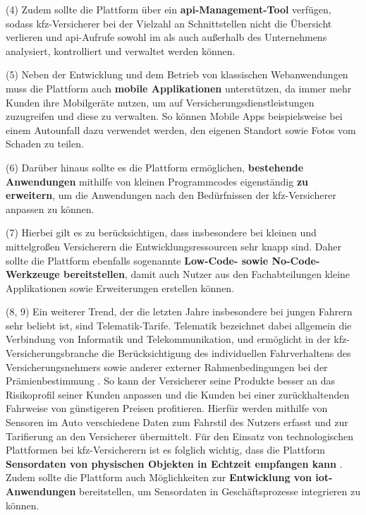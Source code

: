 (4) Zudem sollte die Plattform über ein \textbf{\ac{api}-Management-Tool} verfügen, sodass \ac{kfz}-Versicherer bei der Vielzahl an Schnittstellen nicht die Übersicht verlieren und \ac{api}-Aufrufe sowohl im als auch außerhalb des Unternehmens analysiert, kontrolliert und verwaltet werden können. \autocite[Vgl.][S. 67ff]{HANSCHKE2021}

(5) Neben der Entwicklung und dem Betrieb von klassischen Webanwendungen muss die Plattform auch \textbf{mobile Applikationen} unterstützen, da immer mehr Kunden ihre Mobilgeräte nutzen, um auf Versicherungsdienstleistungen zuzugreifen und diese zu verwalten. So können Mobile Apps beispielsweise bei einem Autounfall dazu verwendet werden, den eigenen Standort sowie Fotos vom Schaden zu teilen. \autocite[Vgl.][S. 7]{HU2020}

(6) Darüber hinaus sollte es die Plattform ermöglichen, \textbf{bestehende Anwendungen} mithilfe von kleinen Programmcodes eigenständig \textbf{zu erweitern}, um die Anwendungen nach den Bedürfnissen der \ac{kfz}-Versicherer anpassen zu können. \autocite[Vgl.][]{WEINGARTNER2023}

(7) Hierbei gilt es zu berücksichtigen, dass insbesondere bei kleinen und mittelgroßen Versicherern die Entwicklungsressourcen sehr knapp sind. Daher sollte die Plattform ebenfalls sogenannte \textbf{Low-Code- sowie No-Code-Werkzeuge bereitstellen}, damit auch Nutzer aus den Fachabteilungen kleine Applikationen sowie Erweiterungen erstellen können.\autocite[Vgl.][]{VBLOWCODE2022}

(8, 9) Ein weiterer Trend, der die letzten Jahre insbesondere bei jungen Fahrern sehr beliebt ist, sind Telematik-Tarife. Telematik bezeichnet dabei allgemein die Verbindung von Informatik und Telekommunikation, \autocite[Vgl.][S. 10-11]{ABTS2017} und ermöglicht in der \ac{kfz}-Versicherungsbranche die Berücksichtigung des individuellen Fahrverhaltens des Versicherungsnehmers sowie anderer externer Rahmenbedingungen bei der Prämienbestimmung \autocite[Vgl.][S. 84]{MERZINGER2017}. So kann der Versicherer seine Produkte besser an das Risikoprofil seiner Kunden anpassen und die Kunden bei einer zurückhaltenden Fahrweise von günstigeren Preisen profitieren. Hierfür werden mithilfe von Sensoren im Auto verschiedene Daten zum Fahrstil des Nutzers erfasst und zur Tarifierung an den Versicherer übermittelt. \autocite[Vgl.][S. 3-4]{ELING2020} Für den Einsatz von technologischen Plattformen bei \ac{kfz}-Versicherern ist es folglich wichtig, dass die Plattform \textbf{Sensordaten von physischen Objekten in Echtzeit empfangen kann} \autocite[Vgl.][S. 10-15]{WEICHERT2015}. Zudem sollte die Plattform auch Möglichkeiten zur \textbf{Entwicklung von \ac{iot}-Anwendungen} bereitstellen, um Sensordaten in Geschäftsprozesse integrieren zu können. 

